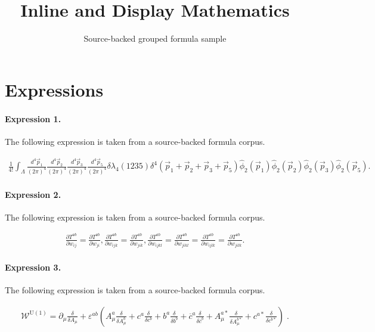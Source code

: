 \documentclass[11pt]{article}
\title{Inline and Display Mathematics}
\author{Source-backed grouped formula sample}
\date{}
\begin{document}
\maketitle
\section{Expressions}
\paragraph{Expression 1.} The following expression is taken from a source-backed formula corpus.

\begin{align*}\frac{1}{4!}\int_{{\Lambda}} \frac{d^4\vec{p}_1}{(2{\pi})^4}\frac{d^4\vec{p}_2}{(2{\pi})^4} \frac{d^4\vec{p}_3}{(2{\pi})^4}\frac{d^4\vec{p}_5}{(2{\pi})^4} {\delta}{\lambda}_4(1235){\delta}^4(\vec{p}_1 + \vec{p}_2+\vec{p}_3+\vec{p}_5) \hat{\phi}_2(\vec{p}_1) \hat{\phi}_2(\vec{p}_2) \hat{\phi}_2(\vec{p}_3) \hat{\phi}_2(\vec{p}_5).\end{align*}

\paragraph{Expression 2.} The following expression is taken from a source-backed formula corpus.

\begin{align*}\frac{\partial T^{ab}}{\partial w_{ij}}=\frac{\partial T^{ab}}{\partial w_{ji}},\frac{\partial T^{ab}}{\partial w_{ijk}}=\frac{\partial T^{ab}}{\partial w_{jik}},\frac{\partial T^{ab}}{\partial w_{ijkl}}=\frac{\partial T^{ab}}{\partial w_{jikl}}=\frac{\partial T^{ab}}{\partial w_{ijlk}}=\frac{\partial T^{ab}}{\partial w_{jilk}}.\end{align*}

\paragraph{Expression 3.} The following expression is taken from a source-backed formula corpus.

\begin{align*}\mathcal{W}^{\mathrm{U(1)}}=\partial _\mu \frac \delta {\delta A_\mu}+\varepsilon ^{ab}\left( A_\mu ^a\frac \delta {\delta A_\mu ^b}+c^a\frac\delta {\delta c^b}+b^a\frac \delta {\delta b^b}+\overline{c}^a\frac \delta{\delta \overline{c}^b}+A_\mu ^{a*}\frac \delta {\delta A_\mu^{b*}}+c^{a*}\frac \delta {\delta c^{b*}}\right) \;. \end{align*}
\end{document}
